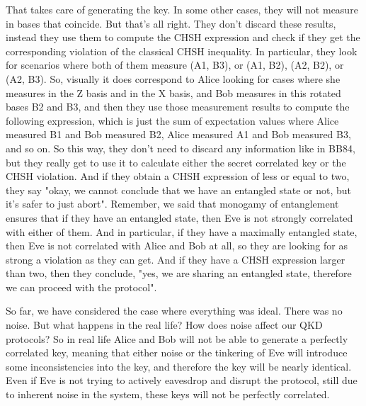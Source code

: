 That takes care of generating the key. In some other cases, they will not measure in bases that coincide. But that's all right. They don't discard these results, instead they use them to compute the CHSH expression and check if they get the corresponding violation of the classical CHSH inequality. In particular, they look for scenarios where both of them measure (A1, B3), or (A1, B2), (A2, B2), or (A2, B3). So, visually it does correspond to Alice looking for cases where she measures in the Z basis and in the X basis, and Bob measures in this rotated bases B2 and B3, and then they use those measurement results to compute the following expression, which is just the sum of expectation values where Alice measured B1 and Bob measured B2, Alice measured A1 and Bob measured B3, and so on. So this way, they don't need to discard any information like in BB84, but they really get to use it to calculate either the secret correlated key or the CHSH violation. And if they obtain a CHSH expression of less or equal to two, they say "okay, we cannot conclude that we have an entangled state or not, but it's safer to just abort". Remember, we said that monogamy of entanglement ensures that if they have an entangled state, then Eve is not strongly correlated with either of them. And in particular, if they have a maximally entangled state, then Eve is not correlated with Alice and Bob at all, so they are looking for as strong a violation as they can get. And if they have a CHSH expression larger than two, then they conclude, "yes, we are sharing an entangled state, therefore we can proceed with the protocol".

So far, we have considered the case where everything was ideal. There was no noise. But what happens in the real life? How does noise affect our QKD protocols? So in real life Alice and Bob will not be able to generate a perfectly correlated key, meaning that either noise or the tinkering of Eve will introduce some inconsistencies into the key, and therefore the key will be nearly identical. Even if Eve is not trying to actively eavesdrop and disrupt the protocol, still due to inherent noise in the system, these keys will not be perfectly correlated.

